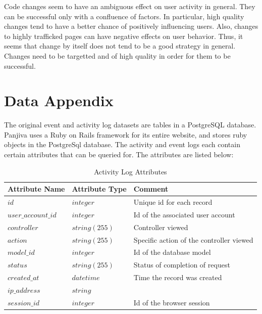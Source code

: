 \documentclass[12pt]{article}
\begin{document}
Code changes seem to have an ambiguous effect on user activity in general. They can be successful only with a confluence of factors. In particular, high quality changes tend to have a better chance of positively influencing users. Also, changes to highly trafficked pages can have negative effects on user behavior. Thus, it seems that change by itself does not tend to be a good strategy in general. Changes need to be targetted and of high quality in order for them to be successful. 

\appendix

\section{Data Appendix}

The original event and activity log datasets are tables in a PostgreSQL database. Panjiva uses a Ruby on Rails framework for its entire website, and stores ruby objects in the PostgreSql database. The activity and event logs each contain certain attributes that can be queried for. The attributes are listed below:

\begin{table}[h!]
\centering
\caption{Activity Log Attributes}
\begin{tabular}{l | l | l}
Attribute Name & Attribute Type & Comment\\
\hline \hline
$id                          $& $integer$  & Unique id for each record   \\ 
$user\_account\_id             $& $integer$  & Id of the associated user account   \\
$controller                  $& $string(255)$ & Controller viewed \\
$action                      $& $string(255)$ & Specific action of the controller viewed \\
$model\_id                    $& $integer$    & Id of the database model \\
$status                      $& $string(255)$ & Status of completion of request \\
$created\_at                  $& $datetime$   & Time the record was created \\ 
$ip\_address                  $& $string$     &  \\
$session\_id                  $& $integer$    & Id of the browser session \\
\end{tabular}
\end{table}
\end{document}
